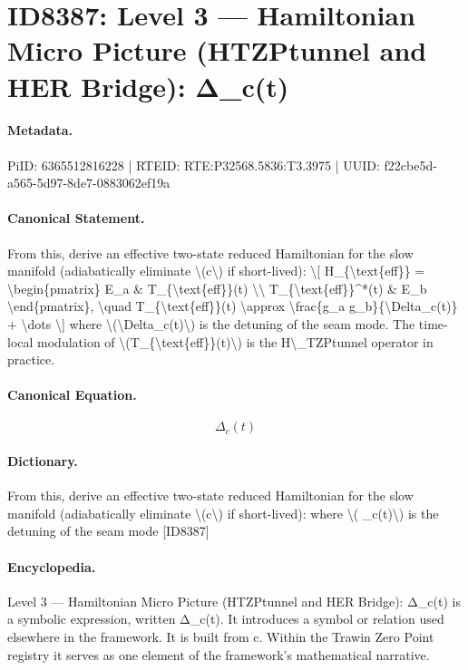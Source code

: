 \section*{ID8387: Level 3 — Hamiltonian Micro Picture (HTZPtunnel and HER Bridge): Δ\_c(t)}
\paragraph{Metadata.}
PiID: 6365512816228 | RTEID: RTE:P32568.5836:T3.3975 | UUID: f22cbe5d-a565-5d97-8de7-0883062ef19a

\paragraph{Canonical Statement.}
From this, derive an effective two-state reduced Hamiltonian for the slow manifold (adiabatically eliminate \textbackslash{}(c\textbackslash{}) if short-lived): \textbackslash{}[ H\_\{\textbackslash{}text\{eff\}\} = \textbackslash{}begin\{pmatrix\} E\_a \& T\_\{\textbackslash{}text\{eff\}\}(t) \textbackslash{}\textbackslash{} T\_\{\textbackslash{}text\{eff\}\}\textasciicircum{}*(t) \& E\_b \textbackslash{}end\{pmatrix\}, \textbackslash{}quad T\_\{\textbackslash{}text\{eff\}\}(t) \textbackslash{}approx \textbackslash{}frac\{g\_a g\_b\}\{\textbackslash{}Delta\_c(t)\} + \textbackslash{}dots \textbackslash{}] where \textbackslash{}(\textbackslash{}Delta\_c(t)\textbackslash{}) is the detuning of the seam mode. The time-local modulation of \textbackslash{}(T\_\{\textbackslash{}text\{eff\}\}(t)\textbackslash{}) is the H\textbackslash{}\_TZPtunnel operator in practice.

\paragraph{Canonical Equation.}
\[
\Delta_c(t)
\]

\paragraph{Dictionary.}
From this, derive an effective two-state reduced Hamiltonian for the slow manifold (adiabatically eliminate \textbackslash{}(c\textbackslash{}) if short-lived): where \textbackslash{}( \_c(t)\textbackslash{}) is the detuning of the seam mode [ID8387]

\paragraph{Encyclopedia.}
Level 3 — Hamiltonian Micro Picture (HTZPtunnel and HER Bridge): Δ\_c(t) is a symbolic expression, written Δ\_c(t). It introduces a symbol or relation used elsewhere in the framework. It is built from c. Within the Trawin Zero Point registry it serves as one element of the framework's mathematical narrative.
